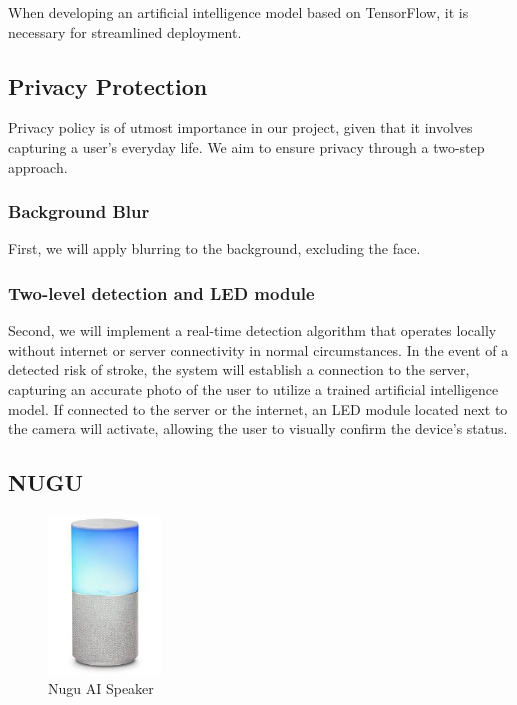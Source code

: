 When developing an artificial intelligence model based on TensorFlow, it is necessary for streamlined deployment.\\

\subsection{\textbf{Privacy Protection}}
Privacy policy is of utmost importance in our project, given that it involves capturing a user's everyday life. We aim to ensure privacy through a two-step approach. \\
\subsubsection{\textbf{Background Blur}}
First, we will apply blurring to the background, excluding the face. \\
\subsubsection{\textbf{Two-level detection and LED module}}
Second, we will implement a real-time detection algorithm that operates locally without internet or server connectivity in normal circumstances. In the event of a detected risk of stroke, the system will establish a connection to the server, capturing an accurate photo of the user to utilize a trained artificial intelligence model. If connected to the server or the internet, an LED module located next to the camera will activate, allowing the user to visually confirm the device's status.\\

\subsection{\textbf{NUGU}}

\begin{figure}[htp]
\centering
\includegraphics[width=3cm]{images/nugu.jpeg}
\caption{Nugu AI Speaker}
\label{fig:nugu}
\end{figure}

